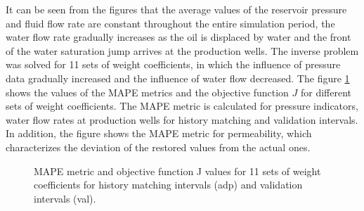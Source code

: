 \documentclass[
11pt,%
tightenlines,%
twoside,%
onecolumn,%
nofloats,%
nobibnotes,%
nofootinbib,%
superscriptaddress,%
noshowpacs,%
centertags]%
{revtex4}
\begin{document}
It can be seen from the figures that the average values of the reservoir pressure and fluid flow rate are constant throughout the entire simulation period, the water flow rate gradually increases as the oil is displaced by water and the front of the water saturation jump arrives at the production wells.
The inverse problem was solved for 11 sets of weight coefficients, in which the influence of pressure data gradually increased and the influence of water flow decreased. The figure \ref{fig:wp} shows the values of the MAPE metrics and the objective function $J$ for different sets of weight coefficients. The MAPE metric is calculated for pressure indicators, water flow rates at production wells for history matching and validation intervals. In addition, the figure shows the MAPE metric for permeability, which characterizes the deviation of the restored values from the actual ones.

\begin{figure}
	\caption{MAPE metric and objective function J values for 11 sets of weight coefficients for history matching
		intervals (adp) and validation intervals (val).}
	\label{fig:wp}
\end{figure}
\end{document}
